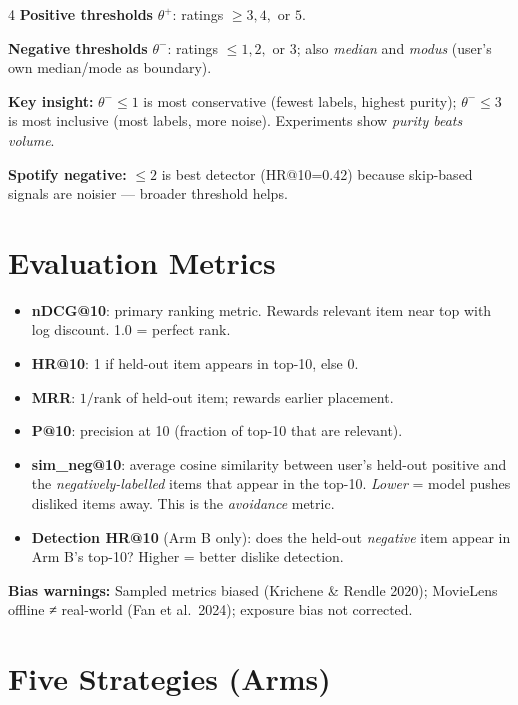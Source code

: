 \documentclass[9pt,a4paper,landscape]{article}
\begin{document}
\begin{multicols}{4}
\textbf{Positive thresholds} $\theta^+$: ratings $\geq 3, 4,$ or $5$.

\textbf{Negative thresholds} $\theta^-$: ratings $\leq 1, 2,$ or $3$; also \emph{median} and \emph{modus} (user's own median/mode as boundary).

\textbf{Key insight:} $\theta^-\!\leq\!1$ is most conservative (fewest labels, highest purity); $\theta^-\!\leq\!3$ is most inclusive (most labels, more noise). Experiments show \emph{purity beats volume}.

\textbf{Spotify negative:} $\leq 2$ is best detector (HR@10=0.42) because skip-based signals are noisier — broader threshold helps.

\section{Evaluation Metrics}

\begin{itemize}
  \item \textbf{nDCG@10}: primary ranking metric. Rewards relevant item near top with log discount. 1.0 = perfect rank.
  \item \textbf{HR@10}: 1 if held-out item appears in top-10, else 0.
  \item \textbf{MRR}: $1/\text{rank}$ of held-out item; rewards earlier placement.
  \item \textbf{P@10}: precision at 10 (fraction of top-10 that are relevant).
  \item \textbf{sim\_neg@10}: average cosine similarity between user's held-out positive and the \emph{negatively-labelled} items that appear in the top-10. \emph{Lower} = model pushes disliked items away. This is the \emph{avoidance} metric.
  \item \textbf{Detection HR@10} (Arm B only): does the held-out \emph{negative} item appear in Arm B's top-10? Higher = better dislike detection.
\end{itemize}

\textbf{Bias warnings:} Sampled metrics biased (Krichene \& Rendle 2020); MovieLens offline ≠ real-world (Fan et al.\ 2024); exposure bias not corrected.

\section{Five Strategies (Arms)}


\end{multicols}
\end{document}
